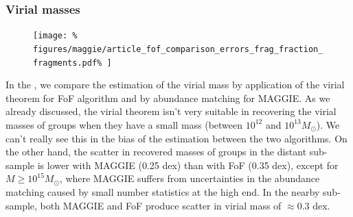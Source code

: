 \subsubsection{Virial masses}
%
\begin{figure}[htb]
    \centering
    \begin{minipage}{0.39\linewidth}
        \texttt{[image: \%
    figures/maggie/article\_fof\_comparison\_errors\_frag\_fraction\_fragments.pdf\%
        ]}
    \end{minipage}
    \begin{minipage}{0.6\linewidth}
        \centering
        \begin{minipage}{\linewidth}
        \end{minipage}
        \begin{minipage}{\linewidth}
        \end{minipage}
    \end{minipage}
\end{figure}

In the , we compare the estimation of the
virial mass by application of the virial theorem for FoF algorithm and by
abundance matching for MAGGIE\@. As we already discussed, the virial theorem
isn't very suitable in recovering the virial masses of groups when they have a
small mass (between $10^{12}$ and $10^{13}M_\odot$). We can't really see this
in the bias of the estimation between the two algorithms. On the other hand,
the scatter in recovered masses of groups in the distant sub-sample is lower
with MAGGIE (0.25 dex) than with FoF (0.35 dex), except for
$M\geqslant10^{15}M_\odot$, where MAGGIE suffers from uncertainties in the
abundance matching caused by small number statistics at the high end. In the
nearby sub-sample, both MAGGIE and FoF produce scatter in virial mass of
$\approx 0.3$ dex.

